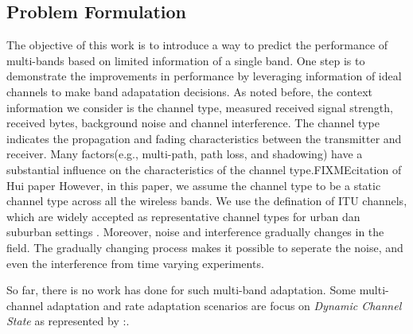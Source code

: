 \subsection{Problem Formulation}
\label{subsec:problem}
The objective of this work is to introduce a way to predict the performance of multi-bands based on limited information of a single band. 
One step is to demonstrate the improvements in performance by leveraging information of ideal channels to make band adapatation decisions. 
As noted before, the context information we consider is the channel type, measured received signal strength, received bytes, background noise and channel interference. 
The channel type indicates the propagation and fading characteristics between the transmitter and receiver. Many factors(e.g., multi-path, path loss, and shadowing) have a substantial influence on the characteristics of the channel type.FIXME{citation of Hui paper} However, in this paper, we assume the channel type to be a static channel type across all the wireless bands. We use the defination of ITU channels, which are widely accepted as representative channel types for urban dan suburban settings \cite{recommendation19971225}. Moreover, noise and interference gradually changes in the field. The gradually changing process makes it possible to seperate the noise, and even the interference from time varying experiments. 

So far, there is no work has done for such multi-band adaptation. 
Some multi-channel adaptation and rate adaptation scenarios are focus on \emph{Dynamic Channel State} as represented by \cite{cordeiro2007c,MOAR}:. 

